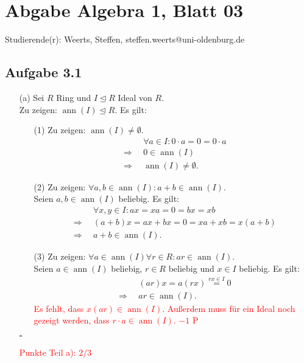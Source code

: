 \documentclass[12pt]{article}
\newcommand{\corr}[1]{\textcolor{red}{#1}}
\newcommand{\QED}{\begin{flushright} $\square$ \end{flushright}}
\newcommand{\df}{\enspace\Longrightarrow\enspace}
\newcommand{\isIdeal}{\trianglelefteq}
\newcommand{\ann}{\operatorname{ann}}
\begin{document}
\section*{Abgabe Algebra 1, Blatt 03}

Studierende(r): Weerts, Steffen, steffen.weerts@uni-oldenburg.de

\subsection*{Aufgabe 3.1}
\begin{enumerate}
	\item[(a)] Sei $R$ Ring und $I\isIdeal R$ Ideal von $R$. \\
	Zu zeigen: $\ann(I)\isIdeal R$. Es gilt:
	\begin{enumerate}
		\item[(1)] Zu zeigen: $\ann(I)\neq\emptyset$.
		\begin{align*}
			&\forall a\in I:0\cdot a=0=0\cdot a \\
			\df &0\in\ann(I) \\
			\df &\ann(I)\neq\emptyset.
		\end{align*}
		
		\item[(2)] Zu zeigen: $\forall a,b\in\ann(I):a+b\in\ann(I)$. \\
		Seien $a,b\in\ann(I)$ beliebig. Es gilt:
		\begin{align*}
			&\forall x,y\in I: ax=xa=0=bx=xb \\
			\df &(a+b)x=ax+bx=0=xa+xb=x(a+b) \\
			\df &a+b\in\ann(I).
		\end{align*}
		
		\item[(3)] Zu zeigen: $\forall a\in\ann(I)\forall r\in R:ar\in\ann(I)$. \\
		Seien $a\in\ann(I)$ beliebig, $r\in R$ beliebig und $x\in I$ beliebig. Es gilt:
		\begin{align*}
			&(ar)x=a(rx) \overset{rx\in I}{=}0 \\
			\df &ar\in\ann(I).
		\end{align*}
\corr{Es fehlt, dass $x(ar)\in \ann(I)$. Außerdem muss für ein Ideal noch gezeigt werden, dass $r\cdot a \in \ann(I)$. $-1$ P}
	\end{enumerate}
	\QED
\corr{Punkte Teil a): $2/3$}
	

\end{enumerate}
\end{document}
